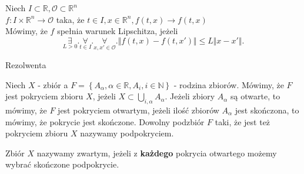 \documentclass{article}
\begin{document}
\begin{definicja}Niech $I\subset \mathbb{R}, \mathcal{O}\subset \mathbb{R}^n$ \\$f: I\times\mathbb{R}^n \to \mathcal{O}$ taka, że $t\in I, x\in \mathbb{R}^n, f(t,x) \to f(t,x)$\\Mówimy, że $f$ spełnia warunek Lipschitza, jeżeli\[\underset{L>0}{\exists}. \underset{t\in I}{\forall}. \underset{x,x'\in \mathcal{O}}{\forall}. \Vert f(t,x) - f(t,x')  \Vert \leq L \Vert x - x' \Vert.\]\end{definicja}

\begin{definicja}Rezolwenta\\\end{definicja}


\begin{definicja}Niech $X$ - zbiór a $F = \left\{ A_\alpha, \alpha\in\mathbb{R}, A_i, i\in\mathbb{N} \right\} $ - rodzina zbiorów. Mówimy, że $F$ jest pokryciem zbioru $X$, jeżeli $X\subset \bigcup_{i,\alpha}A_\alpha$. Jeżeli zbiory $A_\alpha$ są otwarte, to mówimy, że $F$ jest pokryciem otwartym, jeżeli ilość zbiorów $A_\alpha$ jest skończona, to mówimy, że pokrycie jest skończone. Dowolny podzbiór $F$ taki, że jest też pokryciem zbioru $X$ nazywamy podpokryciem.\end{definicja}\begin{definicja}Zbiór $X$ nazywamy zwartym, jeżeli z \textbf{każdego} pokrycia otwartego możemy wybrać skończone podpokrycie.\end{definicja}
\end{document}
